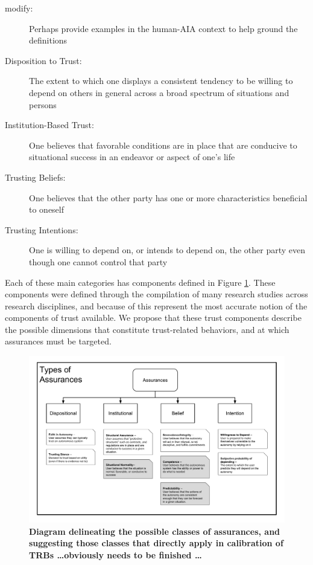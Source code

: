         \begin{description}
            \item [modify:] Perhaps provide examples in the human-AIA context to help ground the definitions
            \item [Disposition to Trust:] The extent to which one displays a consistent tendency to be willing to depend on others in general across a broad spectrum of situations and persons
            \item [Institution-Based Trust:] One believes that favorable conditions are in place that are conducive to situational success in an endeavor or aspect of one's life
            \item [Trusting Beliefs:] One believes that the other party has one or more characteristics beneficial to oneself
            \item [Trusting Intentions:] One is willing to depend on, or intends to depend on, the other party even though one cannot control that party
        \end{description}

        Each of these main categories has components defined in Figure \ref{fig:Assurance_classes}. These components were defined through the compilation of many research studies across research disciplines, and because of this represent the most accurate notion of the components of trust available. We propose that these trust components describe the possible dimensions that constitute trust-related behaviors, and at which assurances must be targeted.

        \begin{figure}
            \includegraphics[width=8in]{Figures/Assurances.pdf}%
            \caption{\textbf{Diagram delineating the possible classes of assurances, and suggesting those classes that directly apply in calibration of TRBs \ldots obviously needs to be finished \ldots}}
            \label{fig:Assurance_classes}
        \end{figure}

